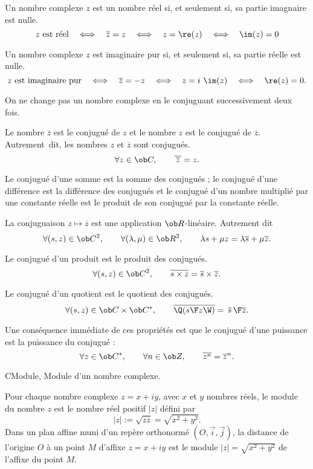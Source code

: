 \Propriete 
Un nombre complexe $z$ est un nombre réel si, et seulement si, sa partie imagnaire est nulle. 
$$
z\mbox{ est réel}\quad\Longleftrightarrow\quad \overline z=z\quad\Longleftrightarrow\quad z=\re(z)\quad\Longleftrightarrow\quad\im(z)=0
$$

\Propriete 
Un nombre complexe $z$ est imaginaire pur si, et seulement si, sa partie réelle est nulle. 
$$
z\mbox{ est imaginaire pur}\quad\Longleftrightarrow\quad \overline z=-z\quad\Longleftrightarrow\quad z=i\ \im(z)\quad\Longleftrightarrow\quad\re(z)=0.
$$

On ne change pas un nombre complexe en le conjuguant successivement deux fois. 
\medskip

\Bullet Le nombre $\overline z$ est le conjugué de $z$ et le nombre $z$ est le conjugué de $\overline z$. Autrement~dit, les nombres $z$ et $\overline z$ sont conjugués. 
$$
\forall z\in\ob C,\qquad \overline{\thinspace\overline z\thinspace}=z.
$$

Le conjugué d'une somme est la somme des conjugués ; le conjugué d'une différence est la différence des conjugués et 
le conjugué d'un nombre multiplié par une constante réelle est le produit de son conjugué par la constante réelle. 
\medskip

\Bullet
La conjuguaison $z\mapsto\overline z$ est une application $\ob R$-linéaire. Autrement dit 
$$
\forall (s,z)\in\ob C^2,\qquad\forall(\lambda,\mu)\in\ob R^2, 
\qquad \lambda s+\mu z=\lambda\overline s+\mu\overline z.
$$


\Bullet Le conjugué d'un produit est le produit des conjugués. 
$$
\forall (s,z)\in\ob C^2, \qquad \overline{s\times z}=\overline s\times \overline z.
$$


\Bullet Le conjugué d'un quotient est le quotient des conjugués. 
$$
\forall (s,z)\in\ob C\times\ob C^*, \qquad 
\overline{\Q({s\F z}\W)}={\thinspace\overline s\thinspace\F \overline z}.
$$

Une conséquence immédiate de ces propriétés est que le conjugué d'une puissance est la puissance du conjugué : 
$$
\forall z\in\ob C^*, \qquad\forall n\in\ob Z, \qquad \overline{z^n}=\overline z^n.
$$

\Section CModule, Module d'un nombre complexe. 

\Definition 
Pour chaque nombre complexe $z=x+iy$, avec $x$ et $y$ nombres réels, le mo\-du\-le du nombre $z$ est le nombre réel positif $|z|$ défini par 
$$
|z|:=\sqrt{z\overline z}=\sqrt{x^2+y^2}. 
$$
\medskip
Dans un plan affine muni d'un repère orthonormé $(O,\vec i,\vec j)$, la distance de l'origine $O$ à un point $M$ d'affixe $z=x+iy$ 
est le module $|z|=\sqrt{x^2+y^2}$ de l'affixe du point $M$. 

